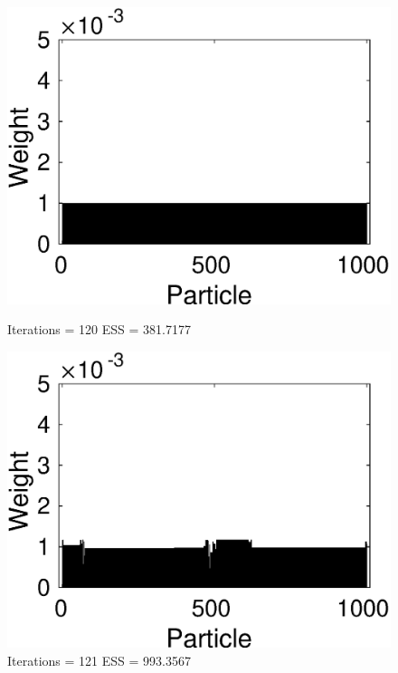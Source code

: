 \documentclass[12pt]{article}
\begin{document}
\begin{figure}[ht!]
\centering
	\begin{minipage}{0.5\textwidth}
		\centering
		\includegraphics[scale = 0.5]{./Figures/120resampled.eps}
		\caption*{Iterations = 120 ESS = 381.7177}
	\end{minipage}%
	\begin{minipage}{0.5\textwidth}
		\centering
		\includegraphics[scale = 0.5]{./Figures/121.eps}
		\caption*{Iterations = 121 ESS = 993.3567} 
	\end{minipage}
	\begin{minipage}{0.5\textwidth}
		\centering

\end{minipage}
\end{figure}
\end{document}
